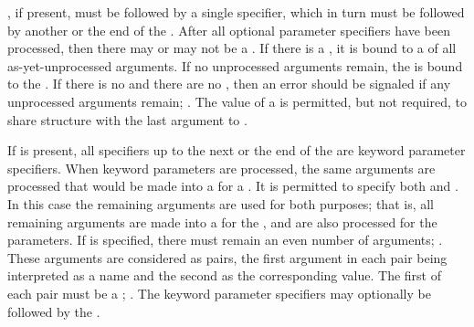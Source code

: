 \endsubsubsection%


, if present, must be followed by a single 
specifier, which in turn must be followed by another 
 or the end of the .  After all
optional parameter specifiers have been processed, then there may or
may not be a .  If there is a , it is
bound to a  of all as-yet-unprocessed arguments.  If
no unprocessed arguments remain, the  is bound to the
.  If there is no  and there are no 
, then an error  should be signaled if
any unprocessed arguments remain; \seesection\FuncallErrorChecking.
The value of a 
is permitted, but not required, to share structure with the
last argument to .

\endsubsubsection%

                       
If  
is present, all specifiers up to the next 
or the end of the  are keyword parameter specifiers.
When keyword parameters are processed,
the same arguments are processed that
would be made into a  for a .
It is permitted to specify both  and .
In this case the remaining arguments are used for both purposes;
that is, all remaining arguments are made into a  for the
, and are also processed for the  parameters.
If  is specified, there must remain
an even number of arguments; \seesection\OddNumberOfKeyArgs.
These arguments are considered as pairs,
the first argument in each pair being interpreted as a name
and the second as the corresponding value.
The first  of each pair must be a ;
\seesection\InvalidKeyArgs.
The keyword parameter specifiers may optionally be followed by the
 .

